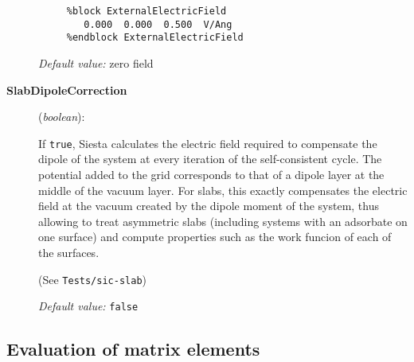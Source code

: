 \documentclass[11pt]{article}
\begin{document}
\begin{description}
\begin{verbatim}
     %block ExternalElectricField
        0.000  0.000  0.500  V/Ang
     %endblock ExternalElectricField
\end{verbatim}

{\it Default value:} zero field

\item[{\bf SlabDipoleCorrection}] ({\it boolean}): 

If {\tt true}, {\sc Siesta} calculates the electric field required to
compensate the dipole of the system at every iteration of the
self-consistent cycle. The potential added to the grid corresponds to
that of a dipole layer at the middle of the vacuum layer. For slabs,
this exactly compensates the electric field at the vacuum created by
the dipole moment of the system, thus allowing to treat asymmetric
slabs (including systems with an adsorbate on one surface) and compute
properties such as the work funcion of each of the surfaces.

(See {\tt Tests/sic-slab})

{\it Default value:} {\tt false}

\end{description}

\subsection{Evaluation of matrix elements}
\end{document}
